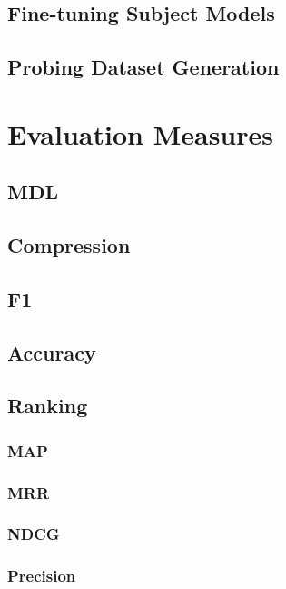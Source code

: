 \subsection{Fine-tuning Subject Models}
\subsection{Probing Dataset Generation}

\section{Evaluation Measures}
\subsection{MDL}
\subsection{Compression}
\subsection{F1}
\subsection{Accuracy}
\subsection{Ranking}
\subsubsection{MAP}
\subsubsection{MRR}
\subsubsection{NDCG}
\subsubsection{Precision}

